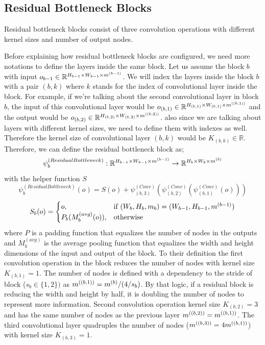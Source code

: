\subsection{Residual Bottleneck Blocks}
Residual bottleneck blocks consist of three convolution operations with different kernel sizes and number of output nodes. 

Before explaining how residual bottleneck blocks are configured, we need more notations to define the layers inside the same block. Let us assume the block $b$ with input $o_{b-1} \in \mathbb{R}^{H_{b-1} \times W_{b-1} \times m^{(b-1)}}$. We will index the layers inside the block $b$ with a pair $(b, k)$ where $k$ stands for the index of convolutional layer inside the block. For example, if we're talking about the second convolutional layer in block $b$, the input of this convolutional layer would be $o_{(b, 1)} \in \mathbb{R}^{H_{(b, 1)} \times W_{(b, 1)} \times m^{((b, 1))}}$ and the output would be $o_{(b, 2)} \in \mathbb{R}^{H_{(b, 2)} \times W_{(b, 2)} \times m^{((b, 2))}}$. also since we are talking about layers with different kernel sizes, we need to define them with indexes as well. Therefore the kernel size of convolutional layer $(b,k)$ would be $K_{(b,k)} \in \mathbb{R}$.
Therefore, we can define the residual bottleneck block as;
$$ \psi_b^{(ResidualBottleneck)}: \mathbb{R}^{H_{b-1} \times W_{b-1} \times m^{(b-1)}} \rightarrow  \mathbb{R}^{H_{b} \times W_{b} \times m^{(b)}} $$
with the helper function $S$
$$ \psi_b^{(ResidualBottleneck)}(o) =  S(o) + \psi_{(b, 3)}^{(Conv)}(\psi_{(b, 2)}^{(Conv)}(\psi_{(b, 1)}^{(Conv)}(o))) $$
\begin{equation*}
    S_b(o) = 
\begin{cases}
    o, &\text{if } (W_b, H_b, m_b) = (W_{b-1}, H_{b-1}, m^{(b-1)})\\
    P_b(M_b^{(avg)}(o)),& \text{otherwise}\\
\end{cases}
\end{equation*}
where $P$ is a padding function that equalizes the number of nodes in the outputs and $M_b^{(avg)}$ is the average pooling function that equalizes the width and height dimensions of the input and output of the block.
To their definition the first convolution operation in the block reduces the number of nodes with kernel size $K_{(b,1)}=1$. The number of nodes is defined with a dependency to the stride of block ($s_b \in \{1,2\})$ as $m^{((b,1))} = m^{(b)}/(4/s_b)$. By that logic, if a residual block is reducing the width and height by half, it is doubling the number of nodes to represent more information. Second convolution operation kernel size $K_{(b,2)}=3$ and has the same number of nodes as the previous layer $m^{((b,2))} = m^{((b,1))}$. The third convolutional layer quadruples the number of nodes ($m^{((b,3))} = 4m^{((b,1))}$) with kernel size $K_{(b,3)} = 1$.

